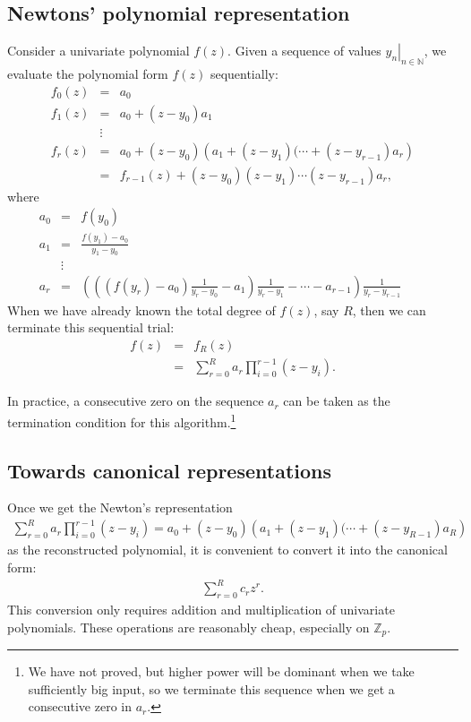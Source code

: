 \documentclass[11pt]{book}
\begin{document}
\subsection{Newtons' polynomial representation}
Consider a univariate polynomial $f(z)$.
Given a sequence of values $\left. y_n \right|_{n \in \mathbb{N}}$, we evaluate the polynomial form $f(z)$ sequentially:
\begin{eqnarray}
f_0(z) &=& a_0 \\
f_1(z) &=& a_0 + (z-y_0)a_1 \\
\nonumber
&\vdots& \\
f_r(z) &=& a_0 + (z-y_0) \left(a_1 + (z-y_1)(\cdots + (z - y_{r-1})a_r \right) \\
&=& f_{r-1}(z) + (z-y_0) (z-y_1) \cdots (z - y_{r-1})a_r,
\end{eqnarray}
where
\begin{eqnarray}
a_0 &=& f(y_0) \\
a_1 &=& \frac{f(y_1) - a_0}{y_1 - y_0} \\
\nonumber
&\vdots& \\
a_r &=& \left( \left( \left( f(y_r)-a_0 \right)\frac{1}{y_r - y_0} - a_1 \right)\frac{1}{y_r - y_1} - \cdots - a_{r-1} \right) \frac{1}{y_r - y_{r-1}} \qquad
\end{eqnarray}
When we have already known the total degree of $f(z)$, say $R$, then we can terminate this sequential trial:
\begin{eqnarray}
f(z) &=& f_R(z) \\
&=& \sum_{r=0}^R a_r \prod_{i=0}^{r-1}(z - y_i).
\end{eqnarray}

In practice, a consecutive zero on the sequence $a_r$ can be taken as the termination condition for this algorithm.\footnote{
We have not proved, but higher power will be dominant when we take sufficiently big input, so we terminate this sequence when we get a consecutive zero in $a_r$.
}

\subsection{Towards canonical representations}
Once we get the Newton's representation
\begin{eqnarray}
\sum_{r=0}^R a_r \prod_{i=0}^{r-1}(z - y_i) = a_0 + (z-y_0) \left(a_1 + (z-y_1)(\cdots + (z - y_{R-1})a_R \right) \quad
\end{eqnarray}
as the reconstructed polynomial, it is convenient to convert it into the canonical form:
\begin{eqnarray}
\sum_{r=0}^R c_r z^r.
\end{eqnarray}
This conversion only requires addition and multiplication of univariate polynomials.
These operations are reasonably cheap, especially on $\mathbb{Z}_p$. 
\end{document}
